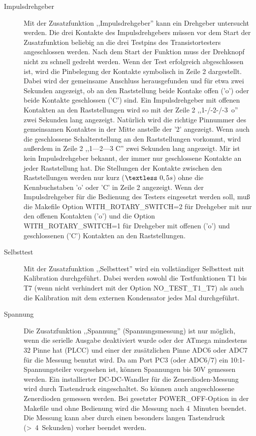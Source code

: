 \begin{description}
 \item[Impulsdrehgeber]
Mit der Zusatzfunktion ,,Impulsdrehgeber'' kann ein Drehgeber untersucht werden.
Die drei Kontakte des Impulsdrehgebers müssen vor dem Start der Zusatzfunktion beliebig an die drei Testpins
 des Transistortesters angeschlossen werden.
Nach dem Start der Funktion muss der Drehknopf nicht zu schnell gedreht werden.
Wenn der Test erfolgreich abgeschlossen ist, wird die Pinbelegung der Kontakte symbolisch in Zeile 2 dargestellt.
Dabei wird der gemeinsame Anschluss herausgefunden und für etwa zwei Sekunden angezeigt, ob an den Raststellung beide Kontake offen ('o')
oder beide Kontakte geschlossen ('C') sind.
Ein Impulsdrehgeber mit offenen Kontakten an den Raststellungen wird so mit der Zeile 2 ,,1-/-2-/-3~o'' zwei Sekunden lang angezeigt.
Natürlich wird die richtige Pinnummer des gemeinsamen Kontaktes in der Mitte anstelle der '2' angezeigt.
Wenn auch die geschlossene Schalterstellung an den Raststellungen vorkommt,
wird außerdem in Zeile 2 ,,1---2---3 C'' zwei Sekunden lang angezeigt.
Mir ist kein Impulsdrehgeber bekannt, der immer nur geschlossene Kontakte an jeder Raststellung hat.
Die Stellungen der Kontakte zwischen den Raststellungen werden nur kurz (\(\textless~0,5s\)) ohne die Kennbuchstaben 'o' oder 'C' 
in Zeile 2 angezeigt.
Wenn der Impulsdrehgeber für die Bedienung des Testers eingesetzt werden soll, muß die Makefile Option WITH\_ROTARY\_SWITCH=2
für Drehgeber mit nur den offenen Kontakten ('o') und die Option WITH\_ROTARY\_SWITCH=1 für Drehgeber mit
offenen ('o') und geschlossenen ('C') Kontakten an den Raststellungen.\\

 \item[Selbsttest]
Mit der Zusatzfunktion ,,Selbsttest'' wird ein vollständiger Selbsttest mit Kalibration durchgeführt.
Dabei werden sowohl die Testfunktionen T1 bis T7 (wenn nicht verhindert mit der Option NO\_TEST\_T1\_T7) 
als auch die Kalibration mit dem externen Kondensator jedes Mal durchgeführt.\\

 \item[Spannung]
Die Zusatzfunktion ,,Spannung'' (Spannungsmessung) ist nur möglich, wenn die serielle Ausgabe deaktiviert wurde
oder der ATmega mindestens 32 Pinne hat (PLCC) und einer der zusätzlichen Pinne ADC6 oder ADC7 für die Messung benutzt wird.
Da am Port PC3 (oder ADC6/7) ein 10:1-Spannungsteiler vorgesehen ist, können Spannungen bis 50V gemessen werden.
Ein installierter DC-DC-Wandler für die Zenerdioden-Messung wird durch Tastendruck eingeschaltet.
So können auch angeschlossene Zenerdioden gemessen werden.
Bei gesetzter POWER\_OFF-Option in der Makefile und ohne Bedienung wird die Messung nach 4~Minuten beendet.
Die Messung kann aber durch einen besonders langen Tastendruck (\textgreater~4~Sekunden) vorher beendet werden.\\


\end{description}
